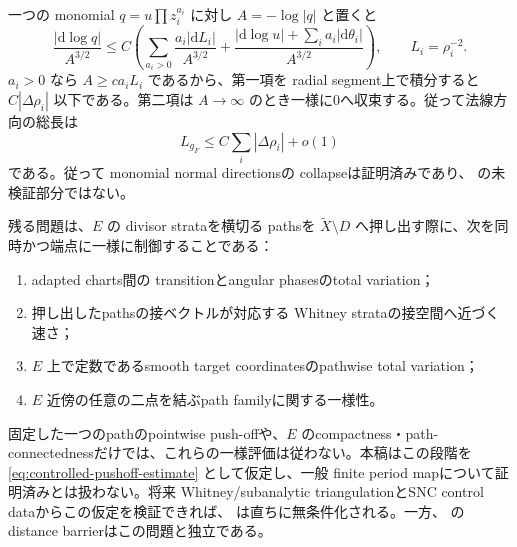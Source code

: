 \documentclass[11pt,a4paper]{ltjsarticle}
\newcommand{\dd}{\mathrm d}
\theoremstyle{plain}
\theoremstyle{definition}
\theoremstyle{remark}
\begin{document}
一つの monomial $q=u\prod z_i^{a_i}$ に対し $A=-\log|q|$ と置くと
\[
 \frac{|\dd\log q|}{A^{3/2}}
 \le
 C\left(
  \sum_{a_i>0}\frac{a_i|\dd L_i|}{A^{3/2}}
  +\frac{|\dd\log u|+\sum_i a_i|\dd\theta_i|}{A^{3/2}}
 \right),
 \qquad L_i=\rho_i^{-2}.
\]
$a_i>0$ なら $A\ge c a_iL_i$ であるから、第一項を radial segment上で積分すると $C|\Delta\rho_i|$ 以下である。第二項は $A\to\infty$ のとき一様に0へ収束する。従って法線方向の総長は
\[
 L_{g_F}\le C\sum_i|\Delta\rho_i|+o(1)
\]
である。従って monomial normal directionsの collapseは証明済みであり、 の未検証部分ではない。

残る問題は、$E$ の divisor strataを横切る pathsを $\widetilde X\setminus D$ へ押し出す際に、次を同時かつ端点に一様に制御することである：
\begin{enumerate}
 \item adapted charts間の transitionとangular phasesのtotal variation；
 \item 押し出したpathsの接ベクトルが対応する Whitney strataの接空間へ近づく速さ；
 \item $E$ 上で定数であるsmooth target coordinatesのpathwise total variation；
 \item $E$ 近傍の任意の二点を結ぶpath familyに関する一様性。
\end{enumerate}
固定した一つのpathのpointwise push-offや、$E$ のcompactness・path-connectednessだけでは、これらの一様評価は従わない。本稿はこの段階を \eqref{eq:controlled-pushoff-estimate} として仮定し、一般 finite period mapについて証明済みとは扱わない。将来 Whitney/subanalytic triangulationとSNC control dataからこの仮定を検証できれば、 は直ちに無条件化される。一方、 のdistance barrierはこの問題と独立である。
\end{document}
